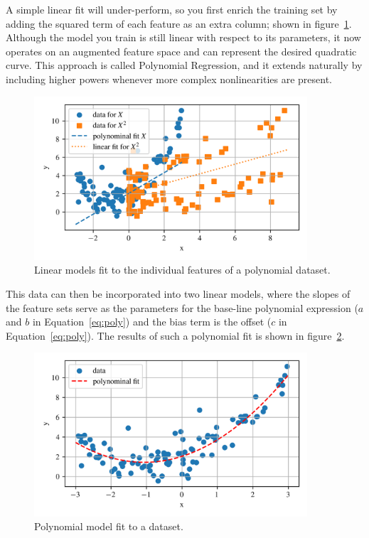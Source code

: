 \documentclass[12pt,letter]{article}
\begin{document}

A simple linear fit will under-perform, so you first enrich the training set by adding the squared term of each feature as an extra column; shown in figure~\ref{fig:Polynomial_2}. Although the model you train is still linear with respect to its parameters, it now operates on an augmented feature space and can represent the desired quadratic curve. This approach is called Polynomial Regression, and it extends naturally by including higher powers whenever more complex nonlinearities are present.


		\begin{figure}[H]
			\centering
			\includegraphics[width=4in]{../figures/polynomial_regression_2}
			\caption{Linear models fit to the individual features of a polynomial dataset.}
			\label{fig:Polynomial_2}
		\end{figure}

\pagebreak
This data can then be incorporated into two linear models, where the slopes of the feature sets serve as the parameters for the base-line polynomial expression ($a$ and $b$ in Equation~\ref{eq:poly}) and the bias term is the offset ($c$ in Equation~\ref{eq:poly}). The results of such a polynomial fit is shown in figure~\ref{fig:Polynomial_3}.


		\begin{figure}[H]
			\centering
			\includegraphics[width=4in]{../figures/polynomial_regression_3}
			\caption{Polynomial model fit to a dataset.}
			\label{fig:Polynomial_3}
		\end{figure}
\end{document}
